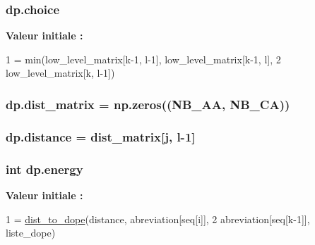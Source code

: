 \subsubsection[{\texorpdfstring{choice}{choice}}]{\setlength{\rightskip}{0pt plus 5cm}dp.\+choice}\hypertarget{namespacedp_a9e99e855e16f129cf3825084e5df1b9e}{}\label{namespacedp_a9e99e855e16f129cf3825084e5df1b9e}
{\bfseries Valeur initiale \+:}
\begin{DoxyCode}
1 = min(low\_level\_matrix[k-1, l-1], low\_level\_matrix[k-1, l],
2                                  low\_level\_matrix[k, l-1])
\end{DoxyCode}
\subsubsection[{\texorpdfstring{dist\+\_\+matrix}{dist_matrix}}]{\setlength{\rightskip}{0pt plus 5cm}dp.\+dist\+\_\+matrix = np.\+zeros(({\bf N\+B\+\_\+\+AA}, {\bf N\+B\+\_\+\+CA}))}\hypertarget{namespacedp_ac12fa4ce0fe851989027b7dbb12fa1c5}{}\label{namespacedp_ac12fa4ce0fe851989027b7dbb12fa1c5}
\subsubsection[{\texorpdfstring{distance}{distance}}]{\setlength{\rightskip}{0pt plus 5cm}dp.\+distance = {\bf dist\+\_\+matrix}\mbox{[}j, l-\/1\mbox{]}}\hypertarget{namespacedp_af9019add66a2cd91daf00423079dd7b9}{}\label{namespacedp_af9019add66a2cd91daf00423079dd7b9}
\subsubsection[{\texorpdfstring{energy}{energy}}]{\setlength{\rightskip}{0pt plus 5cm}int dp.\+energy}\hypertarget{namespacedp_afaae5c94c1ecff360cf10887f6d02f01}{}\label{namespacedp_afaae5c94c1ecff360cf10887f6d02f01}
{\bfseries Valeur initiale \+:}
\begin{DoxyCode}
1 = \hyperlink{namespacedp_a45db1a33ee37d79569eb5dfa56bd621a}{dist\_to\_dope}(distance, abreviation[seq[i]],
2                                               abreviation[seq[k-1]], liste\_dope)
\end{DoxyCode}
